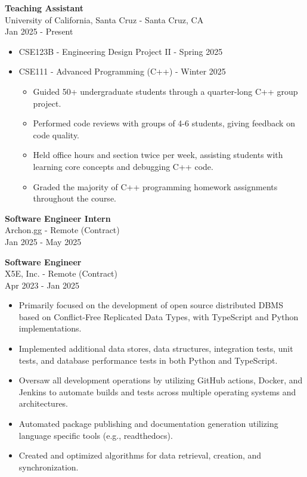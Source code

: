 \documentclass[a4paper,10pt]{article}
\begin{document}
\begin{flushleft}
  \textbf{Teaching Assistant} \\
  University of California, Santa Cruz - Santa Cruz, CA \\
  Jan 2025 - Present
  \begin{itemize}
    \item CSE123B - Engineering Design Project II - Spring 2025
    \item CSE111 - Advanced Programming (C++) - Winter 2025
      \begin{itemize}
        \item Guided 50+ undergraduate students through a quarter-long C++ group project.
        \item Performed code reviews with groups of 4-6 students, giving feedback on code quality.
        \item Held office hours and section twice per week, assisting students with learning core concepts and debugging C++ code.
        \item Graded the majority of C++ programming homework assignments throughout the course.
      \end{itemize}
  \end{itemize}
\end{flushleft}

\begin{flushleft}
  \textbf{Software Engineer Intern} \\
  Archon.gg - Remote (Contract) \\
  Jan 2025 - May 2025
\end{flushleft}

\begin{flushleft}
  \textbf{Software Engineer} \\
  X5E, Inc. - Remote (Contract) \\
  Apr 2023 - Jan 2025
  \begin{itemize}
    \item Primarily focused on the development of open source distributed DBMS based on Conflict-Free Replicated Data Types, with TypeScript and Python implementations.
    \item Implemented additional data stores, data structures, integration tests, unit tests, and database performance tests in both Python and TypeScript.
    \item Oversaw all development operations by utilizing GitHub actions, Docker, and Jenkins to automate builds and tests across multiple operating systems and architectures.
    \item Automated package publishing and documentation generation utilizing language specific tools (e.g., readthedocs).
    \item Created and optimized algorithms for data retrieval, creation, and synchronization.
  \end{itemize}
\end{flushleft}
\end{document}
